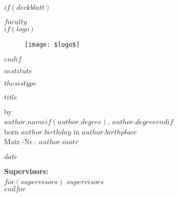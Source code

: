 \documentclass[oneside,12pt,a4paper,bibliography=totoc,numbers=noenddot,table]{scrreprt} %
\begin{document}

$if(deckblatt)$
\begin{titlepage}
\thispagestyle{empty}
\begin{center}

\textsf{\textbf{$faculty$}}\\

$if(logo)$
\begin{figure}[h!]
    \centering
    \texttt{[image: \$logo\$]}
\end{figure}
$endif$

\textsf{\textbf{$institute$}}\\[1,0cm]

\begin{Large}
    \textsf{\textbf{$thesistype$}}\\[0,75cm]
\end{Large}

\begin{LARGE}
    \textsf{\textbf{$title$}}\\[1,5cm]
\end{LARGE}


\vfill

\begin{large}
    \textsf{by}\\[0,1cm]
    \textsf{\textbf{$author.name$}$if(author.degree)$, $author.degree$$endif$}\\[0,1cm]
    \textsf{born $author.birthday$ in $author.birthplace$}\\[0,1cm]
    \textsf{Matr.-Nr.: $author.matr$}\\

    \vspace{0.5em}

    \textsf{$date$}
\end{large}

\vfill

\begin{large}
    \textsf{\textbf{Supervisors:}}\\[0,3cm]
    $for(supervisors)$
    \textsf{$supervisors$}\\[0.5em]
    $endfor$
\end{large}

\end{center}

\end{titlepage}
\thispagestyle{empty}
\cleardoublepage
\end{document}
